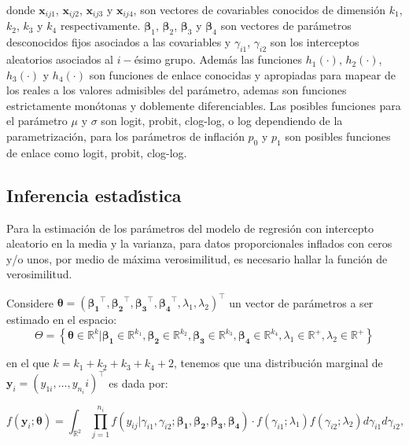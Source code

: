 donde $\mathbf{x}_{ij1}$, $\mathbf{x}_{ij2}$, $\mathbf{x}_{ij3}$ y $\mathbf{x}_{ij4}$, son vectores de covariables conocidos de dimensi\'{o}n $k_1$, $k_2$, $k_3$ y $k_4$ respectivamente. $\boldsymbol{\beta}_1$, $\boldsymbol{\beta}_2$, $\boldsymbol{\beta}_3$ y $\boldsymbol{\beta}_4$ son vectores de par\'{a}metros desconocidos fijos asociados a las covariables y $\gamma_{i1}$, $\gamma_{i2}$ son los interceptos aleatorios asociados al $i-$\'{e}simo grupo. Adem\'{a}s las funciones $h_1(\cdot)$, $h_2(\cdot)$, $h_3(\cdot)$ y $h_4(\cdot)$ son funciones de enlace conocidas y apropiadas para mapear de los reales a los valores admisibles del par\'{a}metro, ademas son funciones estrictamente mon\'{o}tonas y doblemente diferenciables. Las posibles funciones para el par\'{a}metro $\mu$ y $\sigma$ son logit, probit, clog-log, o log dependiendo de la parametrizaci\'{o}n, para los par\'{a}metros de inflaci\'{o}n $p_0$ y $p_1$ son posibles funciones de enlace como logit, probit, clog-log.

\subsection{Inferencia estad\'{\i}stica}

Para la estimaci\'{o}n de los par\'{a}metros del modelo de regresi\'{o}n con intercepto aleatorio en la media y la varianza, para datos proporcionales inflados con ceros y/o unos, por medio de m\'{a}xima verosimilitud, es necesario hallar la funci\'{o}n de verosimilitud.

Considere $\boldsymbol{\theta}=(\boldsymbol{\beta_1}^{\top},\boldsymbol{\beta_2}^{\top},\boldsymbol{\beta_3}^{\top}, \boldsymbol{\beta_4}^{\top},\lambda_1,\lambda_2)^{\top}$ un vector de par\'{a}metros a ser estimado en el espacio:
\[
\Theta=\left\{\boldsymbol{\theta} \in \mathbb{R}^k | \boldsymbol{\beta_1} \in \mathbb{R}^{k_1}, \boldsymbol{\beta_2} \in \mathbb{R}^{k_2}, \boldsymbol{\beta_3} \in \mathbb{R}^{k_3}, \boldsymbol{\beta_4} \in \mathbb{R}^{k_4}, \lambda_1 \in \mathbb{R}^+, \lambda_2 \in \mathbb{R}^+  \right\}
\]

en el que $k=k_1+k_2+k_3+k_4+2$, tenemos que una distribuci\'{o}n marginal de $\mathbf{y}_i=(y_{1i},\ldots, y_{n_i}i)^{\top}$ es dada por:

\[
f(\mathbf{y}_i;\boldsymbol{\theta})=\int_{\mathbb{R}^2}\prod_{j=1}^{n_i}f(y_{ij}|\gamma_{i1},\gamma_{i2};\boldsymbol{\beta_1}, \boldsymbol{\beta_2}, \boldsymbol{\beta_3}, \boldsymbol{\beta_4})\cdot f(\gamma_{i1};\lambda_1) f(\gamma_{i2};\lambda_2) d\gamma_{i1}d\gamma_{i2},
\]

